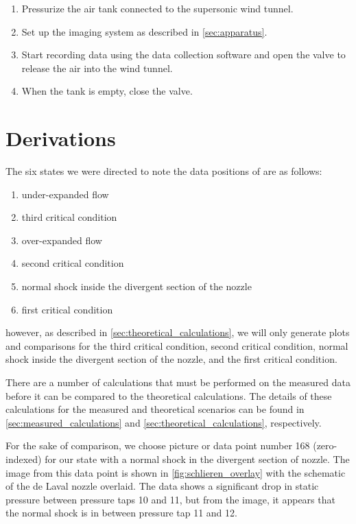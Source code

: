 \begin{enumerate}
    \item Pressurize the air tank connected to the supersonic wind tunnel.
    \item Set up the imaging system as described in \autoref{sec:apparatus}.
    \item Start recording data using the data collection software and open the valve to release the air into the wind tunnel.
    \item When the tank is empty, close the valve.
\end{enumerate}

\section{Derivations} \label{sec:derivations}

The six states we were directed to note the data positions of are as follows:

\begin{enumerate}
    \item under-expanded flow
    \item third critical condition
    \item over-expanded flow
    \item second critical condition
    \item normal shock inside the divergent section of the nozzle
    \item first critical condition
\end{enumerate}

\noindent{}however, as described in \autoref{sec:theoretical_calculations}, we will only generate plots and comparisons for the third critical condition, second critical condition, normal shock inside the divergent section of the nozzle, and the first critical condition.

There are a number of calculations that must be performed on the measured data before it can be compared to the theoretical calculations. The details of these calculations for the measured and theoretical scenarios can be found in \autoref{sec:measured_calculations} and \autoref{sec:theoretical_calculations}, respectively.

For the sake of comparison, we choose picture or data point number \num{168} (zero-indexed) for our state with a normal shock in the divergent section of nozzle. The image from this data point is shown in \autoref{fig:schlieren_overlay} with the schematic of the de Laval nozzle overlaid. The data shows a significant drop in static pressure between pressure taps \num{10} and \num{11}, but from the image, it appears that the normal shock is in between pressure tap \num{11} and \num{12}.

